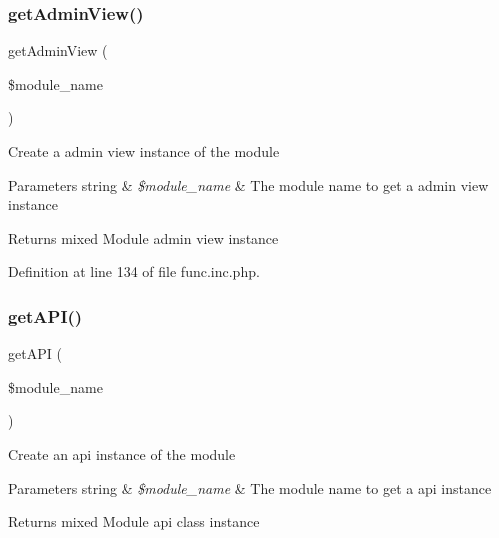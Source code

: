 \mbox{\label{func_8inc_8php_a194629ccc05f325c64834925b05d0941}} 
\subsubsection{\texorpdfstring{get\+Admin\+View()}{getAdminView()}}
{\footnotesize\ttfamily get\+Admin\+View (\begin{DoxyParamCaption}\item[{}]{\$module\+\_\+name }\end{DoxyParamCaption})}

Create a admin view instance of the module


\begin{DoxyParams}[1]{Parameters}
string & {\em \$module\+\_\+name} & The module name to get a admin view instance \\
\hline
\end{DoxyParams}
\begin{DoxyReturn}{Returns}
mixed Module admin view instance 
\end{DoxyReturn}


Definition at line 134 of file func.\+inc.\+php.

\mbox{\label{func_8inc_8php_a12c822fc3e002eb1c58c58001db7ac88}} 
\subsubsection{\texorpdfstring{get\+A\+P\+I()}{getAPI()}}
{\footnotesize\ttfamily get\+A\+PI (\begin{DoxyParamCaption}\item[{}]{\$module\+\_\+name }\end{DoxyParamCaption})}

Create an api instance of the module


\begin{DoxyParams}[1]{Parameters}
string & {\em \$module\+\_\+name} & The module name to get a api instance \\
\hline
\end{DoxyParams}
\begin{DoxyReturn}{Returns}
mixed Module api class instance 
\end{DoxyReturn}


